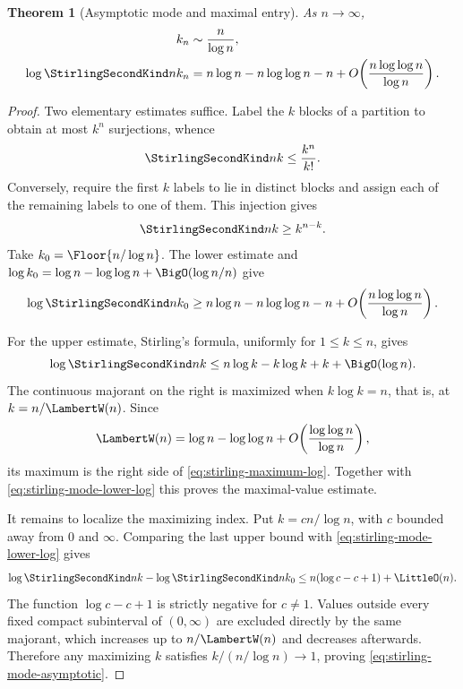 \documentclass[11pt,a4paper,oneside,openany]{book}
\newtheorem{theorem}{Theorem}[chapter]
\theoremstyle{definition}
\theoremstyle{remark}
\begin{document}
\begin{theorem}[Asymptotic mode and maximal entry]
\label{thm:stirling-mode-asymptotic}
As $n\to\infty$,
\begin{align}
 k_n&\sim\frac{n}{\log n},
 \label{eq:stirling-mode-asymptotic}\\
 \log\StirlingSecondKind n{k_n}
 &=n\log n-n\log\log n-n
   +O\!\left(\frac{n\log\log n}{\log n}\right).
 \label{eq:stirling-maximum-log}
\end{align}
\end{theorem}
\begin{proof}
Two elementary estimates suffice.  Label the $k$ blocks of a partition to obtain
at most $k^n$ surjections, whence
\begin{equation}
\label{eq:stirling-mode-upper}
 \StirlingSecondKind nk\le\frac{k^n}{k!}.
\end{equation}
Conversely, require the first $k$ labels to lie in distinct blocks and assign each
of the remaining labels to one of them.  This injection gives
\begin{equation}
\label{eq:stirling-mode-lower}
 \StirlingSecondKind nk\ge k^{n-k}.
\end{equation}
Take $k_0=\Floor{n/\log n}$.  The lower estimate and
$\log k_0=\log n-\log\log n+\BigO(\log n/n)$ give
\begin{equation}
\label{eq:stirling-mode-lower-log}
 \log\StirlingSecondKind n{k_0}
 \ge n\log n-n\log\log n-n
     +O\!\left(\frac{n\log\log n}{\log n}\right).
\end{equation}

For the upper estimate, Stirling's formula, uniformly for $1\le k\le n$, gives
\[
 \log\StirlingSecondKind nk
 \le n\log k-k\log k+k+\BigO(\log n).
\]
The continuous majorant on the right is maximized when
$k\log k=n$, that is, at $k=n/\LambertW(n)$.  Since
\[
 \LambertW(n)=\log n-\log\log n
      +O\!\left(\frac{\log\log n}{\log n}\right),
\]
its maximum is the right side of \eqref{eq:stirling-maximum-log}.  Together with
\eqref{eq:stirling-mode-lower-log} this proves the maximal-value estimate.

It remains to localize the maximizing index.  Put
$k=c n/\log n$, with $c$ bounded away from $0$ and $\infty$.  Comparing the last
upper bound with \eqref{eq:stirling-mode-lower-log} gives
\[
 \log\StirlingSecondKind nk-\log\StirlingSecondKind n{k_0}
 \le n(\log c-c+1)+\LittleO(n).
\]
The function $\log c-c+1$ is strictly negative for $c\ne1$.  Values outside every
fixed compact subinterval of $(0,\infty)$ are excluded directly by the same
majorant, which increases up to $n/\LambertW(n)$ and decreases afterwards.  Therefore any
maximizing $k$ satisfies $k/(n/\log n)\to1$, proving
\eqref{eq:stirling-mode-asymptotic}.
\end{proof}
\end{document}
